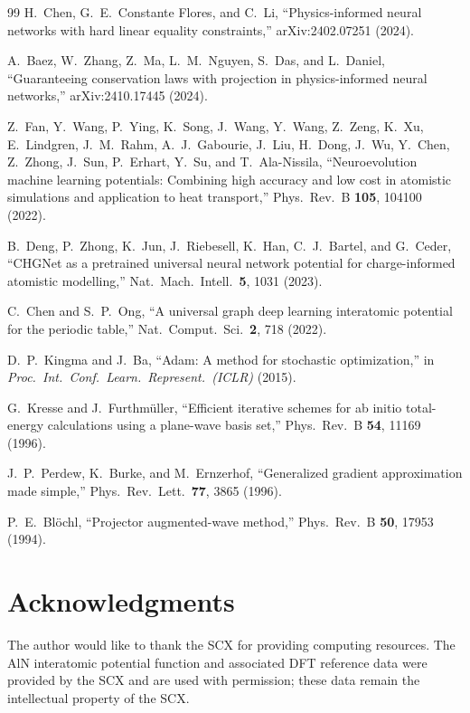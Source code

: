 \documentclass[twoside,prb,aps,floatfix,superscriptaddress,longbibliography]{revtex4-2}
\begin{document}
\begin{thebibliography}{99}
H.~Chen, G.~E.~Constante Flores, and C.~Li, ``Physics-informed neural networks with hard linear equality constraints,'' arXiv:2402.07251 (2024).

A.~Baez, W.~Zhang, Z.~Ma, L.~M.~Nguyen, S.~Das, and L.~Daniel, ``Guaranteeing conservation laws with projection in physics-informed neural networks,'' arXiv:2410.17445 (2024).

Z.~Fan, Y.~Wang, P.~Ying, K.~Song, J.~Wang, Y.~Wang, Z.~Zeng, K.~Xu, E.~Lindgren, J.~M.~Rahm, A.~J.~Gabourie, J.~Liu, H.~Dong, J.~Wu, Y.~Chen, Z.~Zhong, J.~Sun, P.~Erhart, Y.~Su, and T.~Ala-Nissila, ``Neuroevolution machine learning potentials: Combining high accuracy and low cost in atomistic simulations and application to heat transport,'' Phys.\ Rev.\ B \textbf{105}, 104100 (2022).

B.~Deng, P.~Zhong, K.~Jun, J.~Riebesell, K.~Han, C.~J.~Bartel, and G.~Ceder, ``CHGNet as a pretrained universal neural network potential for charge-informed atomistic modelling,'' Nat.\ Mach.\ Intell.\ \textbf{5}, 1031 (2023).

C.~Chen and S.~P.~Ong, ``A universal graph deep learning interatomic potential for the periodic table,'' Nat.\ Comput.\ Sci.\ \textbf{2}, 718 (2022).

D.~P.~Kingma and J.~Ba, ``Adam: A method for stochastic optimization,'' in \textit{Proc.\ Int.\ Conf.\ Learn.\ Represent.\ (ICLR)} (2015).

G.~Kresse and J.~Furthm\"{u}ller, ``Efficient iterative schemes for ab initio total-energy calculations using a plane-wave basis set,'' Phys.\ Rev.\ B \textbf{54}, 11169 (1996).

J.~P.~Perdew, K.~Burke, and M.~Ernzerhof, ``Generalized gradient approximation made simple,'' Phys.\ Rev.\ Lett.\ \textbf{77}, 3865 (1996).

P.~E.~Bl\"{o}chl, ``Projector augmented-wave method,'' Phys.\ Rev.\ B \textbf{50}, 17953 (1994).

\end{thebibliography}

\section*{Acknowledgments}
The author would like to thank the SCX for providing computing resources. The AlN interatomic potential function and associated DFT reference data were provided by the SCX and are used with permission; these data remain the intellectual property of the SCX.
\end{document}
